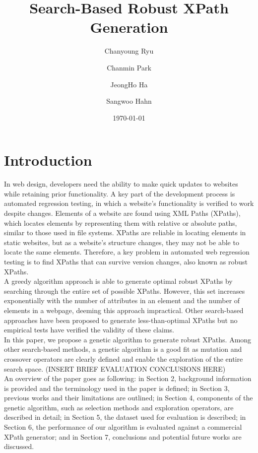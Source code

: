 \documentclass[format=acmlarge, nonacm=true]{acmart}
\title{Search-Based Robust XPath Generation}
\author{Chanyoung Ryu}
\affiliation{KAIST Department of Computer Science}
\author{Chanmin Park}
\affiliation{KAIST Department of Computer Science}
\author{JeongHo Ha}
\affiliation{KAIST Department of Computer Science}
\author{Sangwoo Hahn}
\affiliation{KAIST Department of Computer Science}
\date{\today}
\begin{document}
\maketitle
\section{Introduction}
In web design, developers need the ability to make quick updates to websites while retaining prior functionality. A key part of the development process is automated regression testing, in which a website’s functionality is verified to work despite changes. Elements of a website are found using XML Paths (XPaths), which locates elements by representing them with relative or absolute paths, similar to those used in file systems. XPaths are reliable in locating elements in static websites, but as a website's structure changes, they may not be able to locate the same elements. Therefore, a key problem in automated web regression testing is to find XPaths that can survive version changes, also known as robust XPaths.\\
A greedy algorithm approach is able to generate optimal robust XPaths by searching through the entire set of possible XPaths. However, this set increases exponentially with the number of attributes in an element and the number of elements in a webpage, deeming this approach impractical. Other search-based approaches have been proposed to generate less-than-optimal XPaths but no empirical tests have verified the validity of these claims.\\
In this paper, we propose a genetic algorithm to generate robust XPaths. Among other search-based methods, a genetic algorithm is a good fit as mutation and crossover operators are clearly defined and enable the exploration of the entire search space. (INSERT BRIEF EVALUATION CONCLUSIONS HERE) \\
An overview of the paper goes as following: in Section 2, background information is provided and the terminology used in the paper is defined; in Section 3, previous works and their limitations are outlined; in Section 4, components of the genetic algorithm, such as selection methods and exploration operators, are described in detail; in Section 5, the dataset used for evaluation is described; in Section 6, the performance of our algorithm is evaluated against a commercial XPath generator; and in Section 7, conclusions and potential future works are discussed.\\
\end{document}
